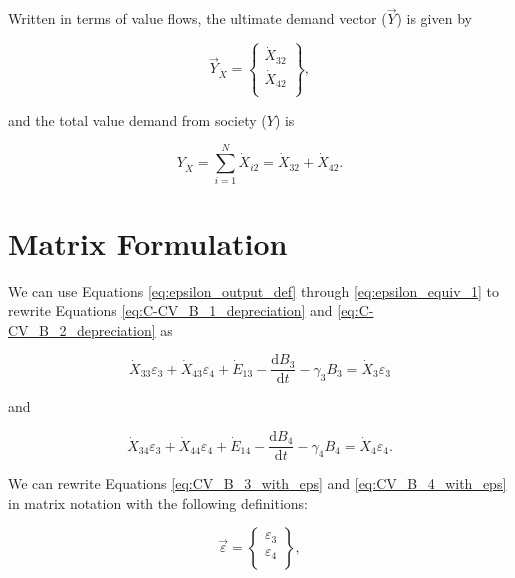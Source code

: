 Written in terms of value flows, the ultimate demand vector ($\vec{Y}$) is given by

\begin{equation} \label{eq:demand_vector_B_dot}
	\vec{Y}_{\dot{X}} = 	\begin{Bmatrix} 	\dot{X}_{32}	\\
																\dot{X}_{42}	\\
									\end{Bmatrix},
\end{equation}

\noindent and the total value demand from society ($Y$) is 

\begin{equation} \label{eq:total_value_demand}
	Y_{\dot{X}} = \sum_{i=1}^{N} \dot{X}_{i2} = \dot{X}_{32} + \dot{X}_{42}.
	\end{equation}


\section{Matrix Formulation}

We can use Equations \ref{eq:epsilon_output_def} through \ref{eq:epsilon_equiv_1} to rewrite Equations \ref{eq:C-CV_B_1_depreciation} and \ref{eq:C-CV_B_2_depreciation} as

\begin{equation} \label{eq:CV_B_3_with_eps}
	\dot{X}_{33}\varepsilon_{3} + \dot{X}_{43}\varepsilon_{4} + \dot{E}_{13} - \frac{\mathrm{d}B_{3}}{\mathrm{d}t} - \gamma_{3}B_{3} = \dot{X}_{3}\varepsilon_{3}
\end{equation}

\noindent and 

\begin{equation} \label{eq:CV_B_4_with_eps}
	\dot{X}_{34}\varepsilon_{3} + \dot{X}_{44}\varepsilon_{4} + \dot{E}_{14} - \frac{\mathrm{d}B_{4}}{\mathrm{d}t} - \gamma_{4}B_{4} = \dot{X}_{4}\varepsilon_{4}.
\end{equation}

We can rewrite Equations \ref{eq:CV_B_3_with_eps} and \ref{eq:CV_B_4_with_eps} in matrix notation with the following definitions:

\begin{equation} \label{eq:eps_vec_def}
	\vec{\varepsilon} =		\begin{Bmatrix} 	\varepsilon_{3}	\\
																\varepsilon_{4}	\\
									\end{Bmatrix},
\end{equation}

